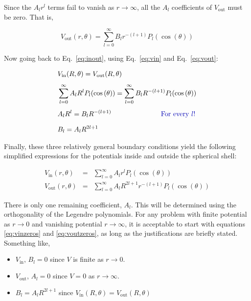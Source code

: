 \documentclass[12pt]{article}
\begin{document}
\begin{flushleft}
Since the $A_{l}r^{l}$ terms fail to vanish as $r\rightarrow \infty$, all the $A_{l}$ coefficients of $V_{\text{out}}$ must be zero.  That is,

\begin{equation}
 V_{\text{out}}(r,\theta) =  \sum_{l=0}^{\infty} B_{l}r^{-(l+1)} P_{l}(\cos{(\theta)})
\label{eq:vout}
\end{equation}

Now going back to Eq.~\ref{eq:inout}, using Eq.~\ref{eq:vin} and Eq.~\ref{eq:vout}:

\begin{align}
& V_{\text{in}}(R,\theta) = V_{\text{out}}(R,\theta) \notag \\[4pt]
& \sum_{l=0}^{\infty} A_{l}R^{l} P_{l}(\cos{(\theta)}) = \sum_{l=0}^{\infty} B_{l}R^{-(l+1)} P_{l}(\cos{(\theta)}) \notag \\[4pt]
& A_{l}R^{l} = B_{l}R^{-(l+1)} \hspace{1in} \text{\color{myblue} For every $l$!} \notag \\[6pt]
& B_{l} = A_{l}R^{2l+1} \label{eq:albl}
\end{align}

Finally, these three relatively general boundary conditions yield the following simplified expressions for the potentials inside and outside the spherical shell:

\begin{eqnarray}
V_{\text{in}}(r,\theta) & = & \sum_{l=0}^{\infty} A_{l}r^{l} P_{l}(\cos{(\theta)}) \label{eq:vinzeros}\\
V_{\text{out}}(r,\theta) &  = & \sum_{l=0}^{\infty} A_{l}R^{2l+1}r^{-(l+1)} P_{l}(\cos{(\theta)}) \label{eq:voutzeros}
\end{eqnarray}

There is only one remaining coefficient, $A_{l}$.  This will be determined using the orthogonality of the Legendre polynomials.  For any problem with finite potential as $r\rightarrow 0$ and vanishing potential $r\rightarrow \infty$, it is acceptable to start with equations \ref{eq:vinzeros} and \ref{eq:voutzeros}, as long as the justifications are briefly stated.  Something like,
\begin{itemize}
\item $V_{\text{in}}$, $B_{l}=0$ since $V$ is finite as $r\rightarrow 0$. \\
\item $V_{\text{out}}$, $A_{l}=0$ since $V=0$ as $r\rightarrow \infty$. \\
\item $B_{l} = A_{l}R^{2l+1}$ since $V_{\text{in}}(R,\theta)=V_{\text{out}}(R,\theta)$
\end{itemize}


\end{flushleft}
\end{document}
